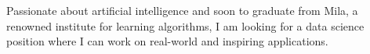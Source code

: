 

\begin{cvparagraph}




Passionate about artificial intelligence and soon to graduate from Mila, a renowned institute for learning algorithms, I am looking for a data science position where I can work on real-world and inspiring applications.


\end{cvparagraph}
